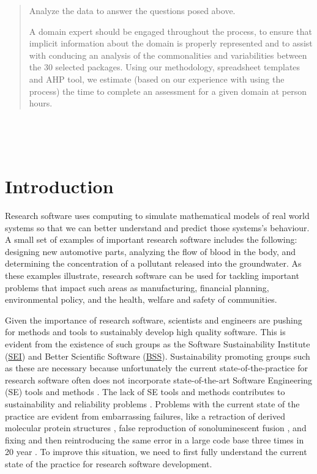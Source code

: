 \documentclass[letterpaper,cleveref]{lipics-v2019}
\newcounter{totHours} %
\begin{document}
\begin{abstract}
\begin{inparaenum}[i)]
    \item Analyze the data to answer the questions posed above.
  \end{inparaenum}
  A domain expert should be engaged throughout the process, to ensure that
  implicit information about the domain is properly represented and to assist
  with conducing an analysis of the commonalities and variabilities between the
  30 selected packages.  Using our methodology, spreadsheet templates and AHP
  tool, we estimate (based on our experience with using the process) the time to
  complete an assessment for a given domain at  person hours.
\end{abstract}

~\newpage

\tableofcontents

~\newpage

\section{Introduction} \label{SecIntroduction}

Research software uses computing to simulate mathematical models of real world
systems so that we can better understand and predict those systems's behaviour.  A
small set of examples of important research software includes the
following: designing new automotive parts, analyzing the flow of blood in the
body, and determining the concentration of a pollutant released into the
groundwater.  As these examples illustrate, research software can be used for
tackling important problems that impact such areas as manufacturing, financial
planning, environmental policy, and the health, welfare and safety of
communities.

Given the importance of research software, scientists and engineers are pushing
for methods and tools to sustainably develop high quality software.  This is
evident from the existence of such groups as the Software Sustainability
Institute (\href{https://www.software.ac.uk/} {SEI}) and Better Scientific
Software (\href{https://bssw.io/} {BSS}).  Sustainability promoting groups such
as these are necessary because unfortunately the current state-of-the-practice
for research software often does not incorporate state-of-the-art Software
Engineering (SE) tools and methods \citep{JohansonAndHasselbring2018}.  The lack
of SE tools and methods contributes to sustainability and reliability problems
\citep{FaulkEtAl2009}.  Problems with the current state of the practice are
evident from embarrassing failures, like a retraction of derived molecular
protein structures \citep{Miller2006}, false reproduction of sonoluminescent
fusion \citep{PostAndVotta2005}, and fixing and then reintroducing the same
error in a large code base three times in 20 year
\citep{MilewiczAndRaybourn2018}.  To improve this situation, we need to first
fully understand the current state of the practice for research software
development.
\end{document}
